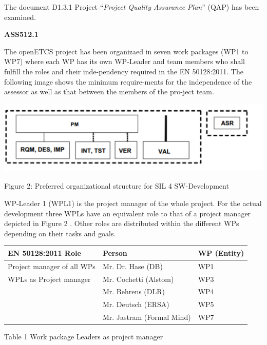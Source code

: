 The document D1.3.1 Project ``\textit{Project Quality Assurance Plan}'' (QAP) has been examined.

{\bfseries
ASS512.1}


\bigskip

The openETCS project has been organizaed in seven work packages (WP1 to WP7) where each WP has its own WP-Leader and team members who shall fulfill the roles and their inde-pendency required in the EN 50128:2011. The following image shows the minimum require-ments for the independence of the assessor as well as that between the members of the pro-ject team.

 \includegraphics[width=13.626cm,height=3.493cm]{images/organizationalstructure.pdf} 

Figure 2: Preferred organizational structure for SIL 4 SW-Development

WP-Leader 1 (WPL1) is the project manager of the whole project. For the actual development three WPLs have an equivalent role to that of a project manager depicted in Figure 2 
. Other roles are distributed within the different WPs depending on their tasks and goals.


\bigskip

\begin{center}
\tablefirsthead{}
\tablehead{}
\tabletail{}
\tablelasttail{}
\begin{supertabular}{|m{5.467cm}|m{5.467cm}|m{3.467cm}|}
\hline
EN 50128:2011 Role  &
Person  &
WP (Entity) \\\hline
Project manager of all WPs  &
Mr. Dr. Hase (DB)  &
WP1 \\\hline
WPLs as Project manager  &
Mr. Cochetti (Alstom)  &
WP3\\\hline
~
 &
Mr. Behrens (DLR) &
WP4\\\hline
~
 &
Mr. Deutsch (ERSA)  &
WP5\\\hline
~
 &
Mr. Jastram (Formal Mind)  &
WP7\\\hline
\end{supertabular}
\end{center}
Table 1 Work package Leaders as project manager

